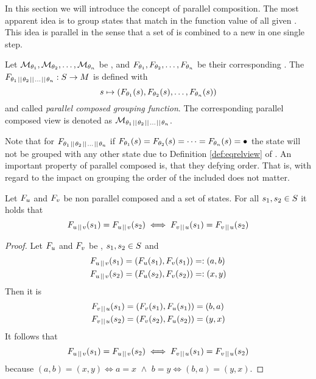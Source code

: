 \documentclass[preview]{standalone}
\begin{document}
\subsubsection{\parllcompNCC} 
In this section we will introduce the concept of parallel composition. The most apparent idea is to group states that match in the function value of all given \grpfctsN. This idea is parallel in the sense that a set of \grpfctN is combined to a new \grpfctN in one single step.

\begin{definition}
	Let $\view[\viewppty_1], \view[\viewppty_2], \dots, \view[\viewppty_n]$ be \viewsN, and $\grpfct[\viewppty_1], \grpfct[\viewppty_2], \dots, \grpfct[\viewppty_n]$ be their corresponding \grpfctsN. The \grpfctN $\grpfct[{\viewppty_1 \pll \viewppty_2 \pll \dots \pll \viewppty_n}]: \states \to \arbset$ is defined with
	\[
	\state \mapsto (\grpfct[\viewppty_1](\state), \grpfct[\viewppty_2](\state), \dots, \grpfct[\viewppty_n](\state))
	\] 
	and called \emph{parallel composed grouping function}.
	The corresponding parallel composed view is denoted as $\view[\viewppty_1 \pll \viewppty_2 \pll \dots \pll \viewppty_n]$.
\end{definition}

Note that for $\grpfct[{\viewppty_1 \pll \viewppty_2 \pll \dots \pll \viewppty_n}]$ if $\grpfct[\viewppty_1](\state) = \grpfct[\viewppty_2](\state) = \dots = \grpfct[\viewppty_n](\state) = \remelem$ the state \state will not be grouped with any other state due to Definition \ref{def:eqrelview} of \eqrelview. An important property of parallel composed \grpfctsN is, that they defying order. That is, with regard to the impact on grouping the order of the included \grpfctsN does not matter.

\begin{proposition}
	Let $\grpfct[u]$ and $\grpfct[v]$ be non parallel composed \grpfctsN and \states a set of states. For all $\state_1, \state_2 \in \states$ it holds that
	\[
	\grpfct[u \pll v](\state_1) = \grpfct[u \pll v](\state_2) \iff \grpfct[v \pll u](\state_1) = \grpfct[v \pll u](\state_2)
	\]
\end{proposition}

\begin{proof}
	Let $\grpfct[u]$ and $\grpfct[v]$ be \grpfctsN, $\state_1, \state_2 \in \states$ and
	\begin{align*}
		\grpfct[u \pll v](\state_1) &= (\grpfct[u](\state_1), \grpfct[v](\state_1)) =: (a, b) \\
		\grpfct[u \pll v](\state_2) &= (\grpfct[u](\state_2), \grpfct[v](\state_2)) =: (x, y)			
	\end{align*}
	Then it is
	\begin{align*}
		\grpfct[v \pll u](\state_1) &= (\grpfct[v](\state_1), \grpfct[u](\state_1)) = (b, a) \\
		\grpfct[v \pll u](\state_2) &= (\grpfct[v](\state_2), \grpfct[u](\state_2)) = (y, x)
	\end{align*}
	It follows that
	\[
	\grpfct[u \pll v](\state_1) = \grpfct[u \pll v](\state_2) \iff \grpfct[v \pll u](\state_1) = \grpfct[v \pll u](\state_2)
	\]
	because $(a, b) = (x, y) \iff a = x \,\, \land \,\, b = y \iff (b, a) = (y, x)$.
\end{proof}
\end{document}

